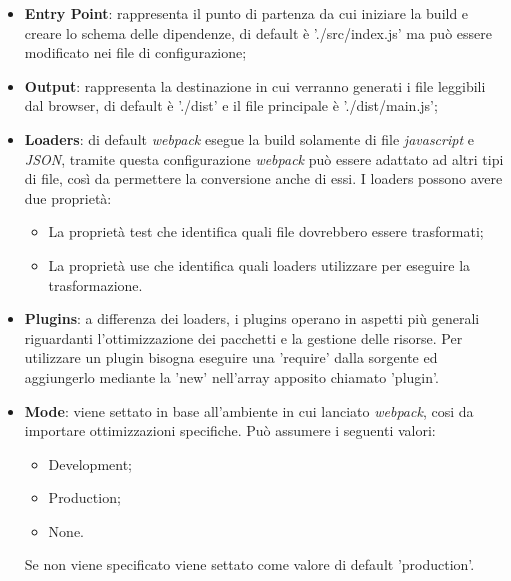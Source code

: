 \begin{itemize}
\item \textbf{Entry Point}: rappresenta il punto di partenza da cui iniziare la build e creare lo schema delle dipendenze, di default è './src/index.js' ma può essere modificato nei file di configurazione;
\item \textbf{Output}: rappresenta la destinazione in cui verranno generati i file leggibili dal browser, di default è './dist' e il file principale è './dist/main.js';
\item \textbf{Loaders}: di default \textit{webpack} esegue la build solamente di file \textit{javascript} e \textit{JSON}\glossario, tramite questa configurazione \textit{webpack} può essere adattato ad altri tipi di file, così da permettere la conversione anche di essi. I loaders possono avere due proprietà: 
	\begin{itemize}
	\item La proprietà test che identifica quali file dovrebbero essere trasformati;
	\item La proprietà use che identifica quali loaders utilizzare per eseguire la trasformazione.
	\end{itemize}
\item \textbf{Plugins}: a differenza dei loaders, i plugins operano in aspetti più generali riguardanti l'ottimizzazione dei pacchetti e la gestione delle risorse. Per utilizzare un plugin bisogna eseguire una 'require' dalla sorgente ed aggiungerlo mediante la 'new' nell'array apposito chiamato 'plugin'.
\item \textbf{Mode}: viene settato in base all'ambiente in cui lanciato \textit{webpack}, cosi da importare ottimizzazioni specifiche. Può assumere i seguenti valori:
	\begin{itemize}
	\item Development;
	\item Production;
	\item None.
	\end{itemize}
Se non viene specificato viene settato come valore di default 'production'.
\end{itemize}

 




